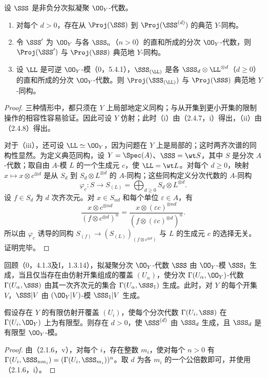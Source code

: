 设 $\SSS$ 是非负分次拟凝聚 $\OO_Y$-代数。
\begin{enumerate}[label=(\roman*)]
\item 对每个 $d>0$，存在从 $\Proj(\SSS)$ 到 $\Proj(\SSS^{(d)})$ 的典范 $Y$-同构。
\item 令 $\SSS'$ 为 $\OO_Y$ 与各 $\SSS_n$（$n>0$）的直和所成的分次 $\OO_Y$-代数，则 $\Proj(\SSS')$ 与 $\Proj(\SSS)$ 典范地 $Y$-同构。
\item 设 $\LL$ 是可逆 $\OO_Y$-模（0，5.4.1），$\SSS_{(\LL)}$ 是各 $\SSS_d\otimes\LL^{\otimes d}$（$d\geq0$）的直和所成的分次 $\OO_Y$-代数。则 $\Proj(\SSS_{(\LL)})$ 与 $\Proj(\SSS)$ 典范地 $Y$-同构。
\end{enumerate}
\begin{proof}
三种情形中，都只须在 $Y$ 上局部地定义同构；与从开集到更小开集的限制操作的相容性容易验证。因此可设 $Y$ 仿射；此时（i）由（2.4.7，i）得出，（ii）由（2.4.8）得出。

对于（iii），还可设 $\LL\simeq\OO_Y$，因为问题在 $Y$ 上是局部的；这时两齐次谱的同构性显然。为定义典范同构，设 $Y=\Spec(A)$、$\SSS=\wt S$，其中 $S$ 是分次 $A$-代数；取自由 $A$-模 $L$ 的一个生成元 $c$，使 $\LL=\wt L$。对每个 $d\geq0$，映射 $x\mapsto x\otimes c^{\otimes d}$ 是从 $S_d$ 到 $S_d\otimes L^{\otimes d}$ 的 $A$-同构；这些同构定义分次代数的 $A$-同构
\[
\varphi_c:S\longrightarrow S_{(L)}=\bigoplus_{d\geq0}S_d\otimes L^{\otimes d}.
\]
设 $f\in S_d$ 为 $d$ 次齐次元。对 $x\in S_{nd}$ 和每个单位 $\varepsilon\in A$，有
\[
\frac{x\otimes c^{\otimes nd}}{(f\otimes c^{\otimes d})^n}
=\frac{x\otimes(\varepsilon c)^{\otimes nd}}{(f\otimes(\varepsilon c)^{\otimes d})^n}.
\]
所以由 $\varphi_c$ 诱导的同构
$S_{(f)}\to(S_{(L)})_{(f\otimes c^{\otimes d})}$ 与 $L$ 的生成元 $c$ 的选择无关。证明完毕。
\end{proof}

回顾（0，4.1.3及I，1.3.14），拟凝聚分次 $\OO_Y$-代数 $\SSS$ 由 $\OO_Y$-模 $\SSS_1$ 生成，当且仅当存在由仿射开集组成的覆盖 $(U_\alpha)$，使分次 $\Gamma(U_\alpha,\OO_Y)$-代数 $\Gamma(U_\alpha,\SSS)$ 由其一次齐次元的集合 $\Gamma(U_\alpha,\SSS_1)$ 生成。此时，对 $Y$ 的每个开集 $V$，$\SSS|V$ 由 $(\OO_Y|V)$-模 $\SSS_1|V$ 生成。

假设存在 $Y$ 的有限仿射开覆盖 $(U_i)$，使每个分次代数 $\Gamma(U_i,\SSS)$ 在 $\Gamma(U_i,\OO_Y)$ 上为有限型。则存在 $d>0$，使 $\SSS^{(d)}$ 由 $\SSS_d$ 生成，且 $\SSS_d$ 是有限型 $\OO_Y$-模。
\begin{proof}
由（2.1.6，v），对每个 $i$，存在整数 $m_i$，使对每个 $n>0$ 有
$\Gamma(U_i,\SSS_{nm_i})=(\Gamma(U_i,\SSS_{m_i}))^n$。取 $d$ 为各 $m_i$ 的一个公倍数即可，并使用（2.1.6，i）。
\end{proof}

